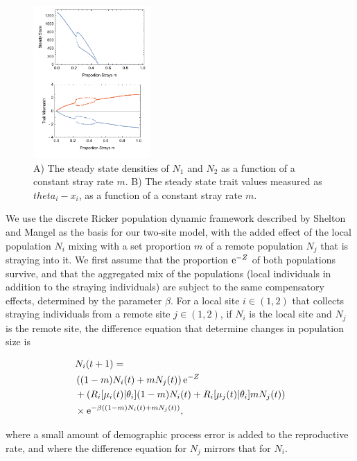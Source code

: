 \documentclass[twocolumn,preprintnumbers,amsmath,amssymb,superscriptaddress]{revtex4}
\begin{document}
\begin{figure}[h]
\centering
\includegraphics[width=0.4\textwidth]{figs/fig_Density.pdf}
\caption{
A) The steady state densities of $N_1$ and $N_2$ as a function of a constant stray rate $m$.
B) The steady state trait values measured as $theta_i - x_i$, as a function of a constant stray rate $m$. 
} \label{fig:traj}
\end{figure}

We use the discrete Ricker population dynamic framework described by Shelton and Mangel \cite{} as the basis for our two-site model, with the added effect of the local population $N_i$ mixing with a set proportion $m$ of a remote population $N_j$ that is straying into it.
We first assume that the proportion ${\rm e}^{-Z}$ of both populations survive, and that the aggregated mix of the populations (local individuals in addition to the straying individuals) are subject to the same compensatory effects, determined by the parameter $\beta$.
For a local site $i\in(1,2)$ that collects straying individuals from a remote site $j\in(1,2)$, if $N_i$ is the local site and $N_j$ is the remote site, the difference equation that determine changes in population size is

\begin{align}
  &N_i(t+1) = \\ \nonumber
  &\left((1-m)N_i(t) + m N_j(t) \right){\rm e}^{-Z} \\ \nonumber
  &+ \left(R_i[\mu_i(t)|\theta_i] (1-m)N_i(t) + R_i[\mu_j(t)|\theta_i] m N_j(t)\right) \\ \nonumber
  &\times {\rm e}^{-\beta ((1-m)N_i(t) + m N_j(t))},
  \label{eq:N}
\end{align}

\noindent where a small amount of demographic process error is added to the reproductive rate, and where the difference equation for $N_j$ mirrors that for $N_i$.
\end{document}
